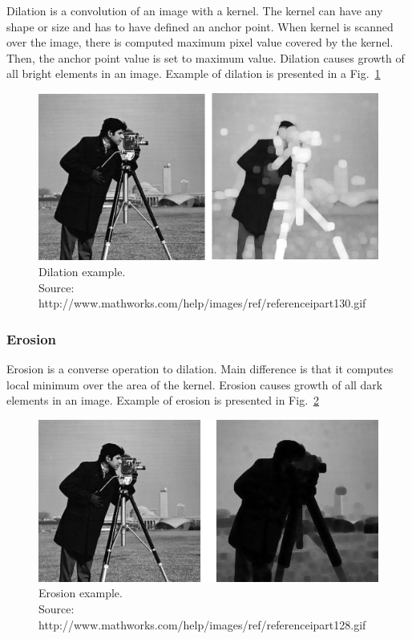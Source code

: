 \documentclass[a4paper,onecolumn,oneside,12pt]{memoir}
\begin{document}
Dilation is a convolution of an image with a kernel. The kernel can have any shape or size and has
to have defined an anchor point. When kernel is scanned over the image, there is computed maximum
pixel value covered by the kernel. Then, the anchor point value is set to maximum value. Dilation
causes growth of all bright elements in an image. Example of dilation is presented in a
Fig.~\ref{dilationExample}

\begin{figure}[ht]
\begin{center}
\includegraphics[scale=0.6]{images/dilationExample.jpg}
\caption{Dilation example. \\
Source: http://www.mathworks.com/help/images/ref/referenceipart130.gif}
\label{dilationExample}
\end{center}
\end{figure}

\subsubsection{Erosion}

Erosion is a converse operation to dilation. Main difference is that it computes local minimum over
the area of the kernel. Erosion causes growth of all dark elements in an image. Example of erosion
is presented in Fig.~\ref{erosionExample}

\begin{figure}[ht]
\begin{center}
\includegraphics[scale=0.6]{images/erosionExample.jpg}
\caption{Erosion example. \\
Source: http://www.mathworks.com/help/images/ref/referenceipart128.gif}
\label{erosionExample}
\end{center}
\end{figure}
\end{document}
